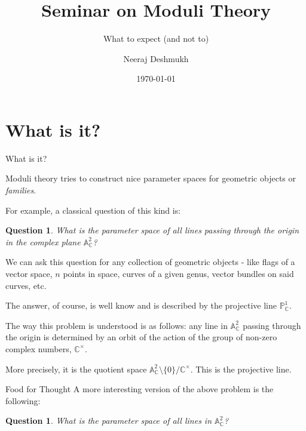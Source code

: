\documentclass[ignorenonframetext]{beamer}
\title{Seminar on Moduli Theory}
\subtitle{What to expect (and not to)}
\author{Neeraj Deshmukh}
\date{\today}
\newcommand{\A}{{\mathbb A}}
\newcommand{\C}{{\mathbb C}}
\renewcommand{\P}{{\mathbb P}}
\theoremstyle{definition}
\newtheorem{question}[theorem]{Question}
\begin{document}
	
	
\begin{frame}
\titlepage
\end{frame}

\section{What is it?}

\begin{frame}{What is it?}

Moduli theory tries to construct nice parameter spaces for geometric objects or \textit{families}. 

For example, a classical question of this kind is: 
\begin{question}\label{projective line}
	\textit{What is the parameter space of all lines  passing through the origin in the complex plane $\A_{\C}^2$?}
\end{question}

We can ask this question for any collection of geometric objects - like flags of a vector space, $n$ points in space, curves of a given genus, vector bundles on said curves, etc. 

\end{frame}


The answer, of course, is well know and is described by the projective line $\P_{\C}^1$.

The way this problem is understood is as follows: any line in $\A_{\C}^2$ passing through the origin is determined by an orbit of the action of the group of non-zero complex numbers, $\C^{\times}$. 

More precisely, it is the quotient space $\A^2_{\C}\setminus \lbrace 0 \rbrace/\C^{\times}$. This is the projective line. 

\begin{frame}{Food for Thought}
A more interesting version of the above problem is the following:

\begin{question}
	\textit{What is the parameter space of all lines in $\A_{\C}^2$?}
\end{question}
\end{frame}
\end{document}
